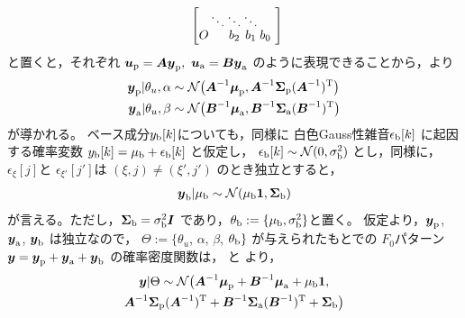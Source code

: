 \begin{align}
\begin{bmatrix}
 &\hspace{-0.3cm}\ddots&\hspace{-0.3cm}\ddots&\hspace{-0.3cm}\ddots&\hspace{-0.3cm}\vspace{-0.1cm}\\
O&\hspace{-0.3cm} &\hspace{-0.3cm}b_2 &\hspace{-0.3cm}b_1 &\hspace{-0.3cm}b_0~
\end{bmatrix}\!
\!\!
\end{align}
と置くと，それぞれ
$%
\Vec{u}_{\rm p}=\Vec{A}\Vec{y}_{\rm p},~
\Vec{u}_{\rm a}=\Vec{B}\Vec{y}_{\rm a}
$%
のように表現できることから，より
\begin{align}
\Vec{y}_{\rm p}|\theta_u,\alpha&\sim\mathcal
{N}\big(
\Mat{A}^{-1}\Vec{\mu}_{\rm p},
\Mat{A}^{-1}\Mat{\Sigma}_{\rm p}
(\Mat{A}^{-1})^{\rm T}
\big)
\label{eq:y_p_dist}
\\
\Vec{y}_{\rm a}|\theta_u,\beta&\sim\mathcal{N}\big(
\Mat{B}^{-1}\Vec{\mu}_{\rm a},
\Mat{B}^{-1}\Mat{\Sigma}_{\rm a}
(\Mat{B}^{-1})^{\rm T}
\big)
\label{eq:y_a_dist}
\end{align}
が導かれる。
ベース成分$y_{\rm b}[k]$についても，同様に
白色Gauss性雑音$\epsilon_{\rm b}[k]$
に起因する確率変数
$y_{\rm b}[k] = \mu_{\rm b} + \epsilon_{\rm b}[k]$
と仮定し，
$\epsilon_{\rm b}[k]\sim\mathcal{N}(0,\sigma_{\rm b}^2)$
とし，同様に，
$\epsilon_{\xi}[j]$と
$\epsilon_{\xi'}[j']$は
$(\xi,j)\neq(\xi',j')$
のとき独立とすると，
\begin{align}
\Vec{y}_{\rm b}|\mu_{\rm b}\sim
\mathcal{N}
(\mu_{\rm b}\Vec{1},\Mat{\Sigma}_{\rm b})
\label{eq:y_b_dist}
\end{align}
が言える。ただし，$\Mat{\Sigma}_{\rm b}=\sigma_{\rm b}^2\Mat{I}$
であり，$\theta_{\rm b}:=\{\mu_{\rm b},\sigma_{\rm b}^2\}$と置く。
仮定より，$\Vec{y}_{\rm p}$, $\Vec{y}_{\rm a}$, $\Vec{y}_{\rm b}$
は独立なので，
$\Theta:=\{\theta_u$, $\alpha$, $\beta$, $\theta_{\rm b}\}$
が与えられたもとでの
$F_0$パターン$\Vec{y}=\Vec{y}_{\rm p}+\Vec{y}_{\rm a}+\Vec{y}_{\rm b}$
の確率密度関数は，
と
より，
\begin{multline}
\Vec{y}|\Theta\sim
\mathcal{N}
\big(
\Mat{A}^{-1}\Vec{\mu}_{\rm p}
+
\Mat{B}^{-1}\Vec{\mu}_{\rm a}
+\mu_{\rm b}\Vec{1}
,
\\
\Vec{A}^{-1}\Vec{\Sigma}_{\rm p}(\Vec{A}^{-1})^{\rm T}
+
\Mat{B}^{-1}\Mat{\Sigma}_{\rm a}(\Mat{B}^{-1})^{\rm T}
+
\Mat{\Sigma}_{\rm b}
\big)
\end{multline}
